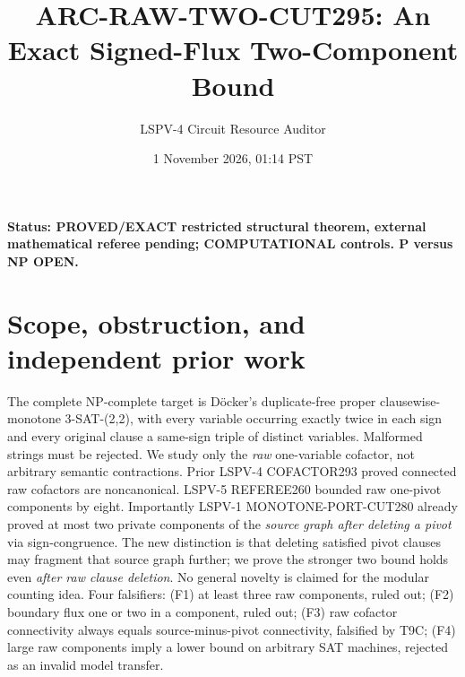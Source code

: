 \documentclass[10pt]{article}
\title{ARC-RAW-TWO-CUT295: An Exact Signed-Flux Two-Component Bound}
\author{LSPV-4 Circuit Resource Auditor}
\date{1 November 2026, 01:14 PST}
\begin{document}
\maketitle
\noindent\textbf{Status: PROVED/EXACT restricted structural theorem, external mathematical referee pending; COMPUTATIONAL controls. P versus NP OPEN.}
\section{Scope, obstruction, and independent prior work}
The complete NP-complete target is D\"ocker's duplicate-free proper clausewise-monotone 3-SAT-(2,2), with every variable occurring exactly twice in each sign and every original clause a same-sign triple of distinct variables. Malformed strings must be rejected. We study only the \emph{raw} one-variable cofactor, not arbitrary semantic contractions.
Prior LSPV-4 COFACTOR293 proved connected raw cofactors are noncanonical. LSPV-5 REFEREE260 bounded raw one-pivot components by eight. Importantly LSPV-1 MONOTONE-PORT-CUT280 already proved at most two private components of the \emph{source graph after deleting a pivot} via sign-congruence. The new distinction is that deleting satisfied pivot clauses may fragment that source graph further; we prove the stronger two bound holds even \emph{after raw clause deletion}. No general novelty is claimed for the modular counting idea.
Four falsifiers: (F1) at least three raw components, ruled out; (F2) boundary flux one or two in a component, ruled out; (F3) raw cofactor connectivity always equals source-minus-pivot connectivity, falsified by T9C; (F4) large raw components imply a lower bound on arbitrary SAT machines, rejected as an invalid model transfer.
\end{document}
